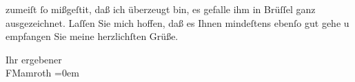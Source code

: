                zumeiſt{ }ſo mißgeſti{\geminationm}t, daß ich überzeugt bin, es gefalle
               ihm in Brüſſel ganz ausgezeichnet. Laſſen Sie
               mich hoffen, daß es Ihnen mindeſtens ebenſo gut gehe u empfangen Sie meine
               herzlichſten Grüße.\pend
           
\pstart
           Ihr ergebener{\\[\baselineskip]}\spacefill\mbox{FMamroth}\pend
           \leftskip=0em{}\endnumbering{}  
      